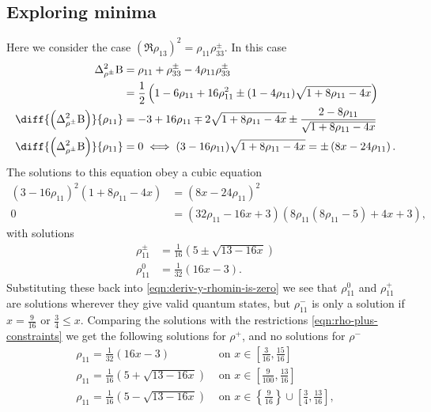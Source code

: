 \subsection{Exploring minima}
Here we consider the case $\left(\Re{\rho_{13}}\right)^2 = \rho_{11}\rho_{33}^\pm$. In this case
\begin{align}
  \var[\rho^\pm]{\opb} &= \rho_{11} + \rho_{33}^\pm -4\rho_{11}\rho_{33}^{\pm}\\
                       &= \frac{1}{2}\left(1 -6\rho_{11} + 16\rho_{11}^2 \pm (1-4\rho_{11})\sqrt{1+8\rho_{11}-4x}\right)\\
  \diff{\left(\var[\rho^\pm]{\opb}\right)}{\rho_{11}} &= -3 + 16\rho_{11} \mp 2\sqrt{1+8\rho_{11}-4x}\pm \frac{2-8\rho_{11}}{\sqrt{1+8\rho_{11} -4x}}\\
  \diff{\left(\var[\rho^\pm]{\opb}\right)}{\rho_{11}} &= 0 \iff (3 - 16\rho_{11})\sqrt{1+8\rho_{11} -4x} =\pm \left(8x-24\rho_{11}\right).
                                                        \label{eqn:deriv-y-rhomin-is-zero}
\end{align}
The solutions to this equation obey a cubic equation
\begin{align}
  (3 - 16\rho_{11})^2(1+8\rho_{11} -4x) &=\left(8x-24\rho_{11}\right)^2\\
  0&= (32 \rho_{11}-16 x+3) (8 \rho_{11} (8 \rho_{11}-5)+4 x+3),
\end{align}
with solutions
\begin{align}
  \rho_{11}^\pm &= \frac{1}{16} \left(5\pm\sqrt{13-16 x}\right)\\
  \rho_{11}^0 &= \frac{1}{32} \left(16 x-3 \right).
\end{align}
Substituting these back into \eqref{eqn:deriv-y-rhomin-is-zero} we see that $\rho_{11}^0$ and $\rho_{11}^+$ are solutions wherever they give valid quantum states, but $\rho_{11}^-$ is only a solution if $x=\frac{9}{16}$ or $\frac{3}{4}\leq x$. Comparing the solutions with the restrictions \eqref{eqn:rho-plus-constraints} we get the following solutions for $\rho^+$, and no solutions for $\rho^-$
\begin{subequations}
\label{eqn:rho-plus-zero-deriv-solns}
\begin{align}
  \rho_{11} = \frac{1}{32} \left(16 x-3 \right) &\text{ on } x\in\left[\frac{3}{16}, \frac{15}{16}\right]\\
  \rho_{11} = \frac{1}{16} \left(5+\sqrt{13 - 16x} \right) &\text{ on } x\in\left[\frac{9}{100},\frac{13}{16}\right]\\
  \rho_{11} = \frac{1}{16} \left(5-\sqrt{13 - 16x} \right) &\text{ on } x\in \left\{\frac{9}{16}\right\}\cup\left[\frac{3}{4},\frac{13}{16}\right],
\end{align}
\end{subequations}
